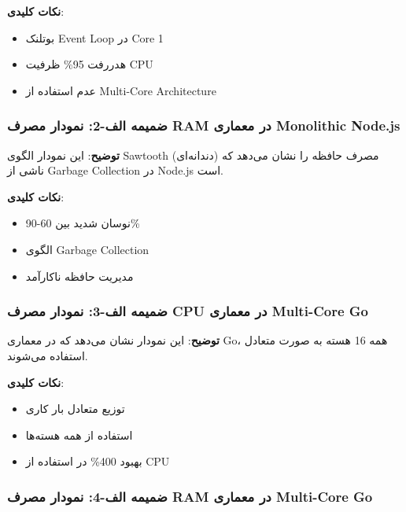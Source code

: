 \documentclass[
]{article}
\providecommand{\tightlist}{%
  \setlength{\itemsep}{0pt}\setlength{\parskip}{0pt}}
\begin{document}
\textbf{نکات کلیدی}:

\begin{itemize}
\tightlist
\item
  بوتلنک Event Loop در Core 1
\item
  هدررفت 95\% ظرفیت CPU
\item
  عدم استفاده از Multi-Core Architecture
\end{itemize}

\subsubsection{ضمیمه الف-2: نمودار مصرف RAM در معماری Monolithic
Node.js}\label{ux636ux645ux6ccux645ux647-ux627ux644ux641-2-ux646ux645ux648ux62fux627ux631-ux645ux635ux631ux641-ram-ux62fux631-ux645ux639ux645ux627ux631ux6cc-monolithic-node.js}

\textbf{توضیح}: این نمودار الگوی Sawtooth (دندانه‌ای) مصرف حافظه را نشان
می‌دهد که ناشی از Garbage Collection در Node.js است.

\textbf{نکات کلیدی}:

\begin{itemize}
\tightlist
\item
  نوسان شدید بین 60-90\%
\item
  الگوی Garbage Collection
\item
  مدیریت حافظه ناکارآمد
\end{itemize}

\subsubsection{ضمیمه الف-3: نمودار مصرف CPU در معماری Multi-Core
Go}\label{ux636ux645ux6ccux645ux647-ux627ux644ux641-3-ux646ux645ux648ux62fux627ux631-ux645ux635ux631ux641-cpu-ux62fux631-ux645ux639ux645ux627ux631ux6cc-multi-core-go}

\textbf{توضیح}: این نمودار نشان می‌دهد که در معماری Go، همه 16 هسته به
صورت متعادل استفاده می‌شوند.

\textbf{نکات کلیدی}:

\begin{itemize}
\tightlist
\item
  توزیع متعادل بار کاری
\item
  استفاده از همه هسته‌ها
\item
  بهبود 400\% در استفاده از CPU
\end{itemize}

\subsubsection{ضمیمه الف-4: نمودار مصرف RAM در معماری Multi-Core
Go}\label{ux636ux645ux6ccux645ux647-ux627ux644ux641-4-ux646ux645ux648ux62fux627ux631-ux645ux635ux631ux641-ram-ux62fux631-ux645ux639ux645ux627ux631ux6cc-multi-core-go}
\end{document}
